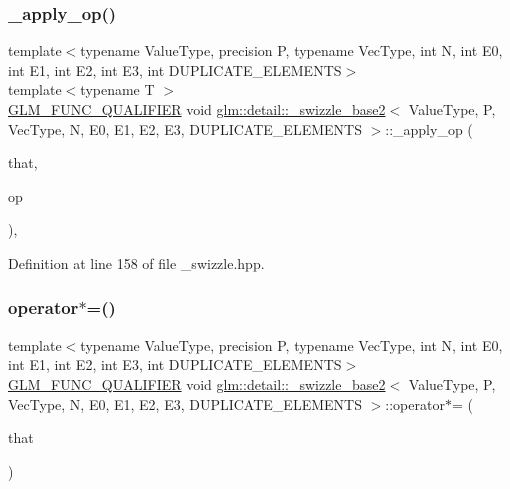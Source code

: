 \subsubsection{\texorpdfstring{\+\_\+apply\+\_\+op()}{\_apply\_op()}}
{\footnotesize\ttfamily template$<$typename Value\+Type, precision P, typename Vec\+Type, int N, int E0, int E1, int E2, int E3, int D\+U\+P\+L\+I\+C\+A\+T\+E\+\_\+\+E\+L\+E\+M\+E\+N\+TS$>$ \\
template$<$typename T $>$ \\
\hyperlink{setup_8hpp_a33fdea6f91c5f834105f7415e2a64407}{G\+L\+M\+\_\+\+F\+U\+N\+C\+\_\+\+Q\+U\+A\+L\+I\+F\+I\+ER} void \hyperlink{structglm_1_1detail_1_1__swizzle__base2}{glm\+::detail\+::\+\_\+swizzle\+\_\+base2}$<$ Value\+Type, P, Vec\+Type, N, E0, E1, E2, E3, D\+U\+P\+L\+I\+C\+A\+T\+E\+\_\+\+E\+L\+E\+M\+E\+N\+TS $>$\+::\+\_\+apply\+\_\+op (\begin{DoxyParamCaption}\item[{const Vec\+Type \&}]{that,  }\item[{T}]{op }\end{DoxyParamCaption})\hspace{0.3cm}{\ttfamily [inline]}, {\ttfamily [protected]}}



Definition at line 158 of file \+\_\+swizzle.\+hpp.

\mbox{\label{structglm_1_1detail_1_1__swizzle__base2_a6c686d110b936939c7ed67d7a6165778}} 
\subsubsection{\texorpdfstring{operator$\ast$=()}{operator*=()}}
{\footnotesize\ttfamily template$<$typename Value\+Type, precision P, typename Vec\+Type, int N, int E0, int E1, int E2, int E3, int D\+U\+P\+L\+I\+C\+A\+T\+E\+\_\+\+E\+L\+E\+M\+E\+N\+TS$>$ \\
\hyperlink{setup_8hpp_a33fdea6f91c5f834105f7415e2a64407}{G\+L\+M\+\_\+\+F\+U\+N\+C\+\_\+\+Q\+U\+A\+L\+I\+F\+I\+ER} void \hyperlink{structglm_1_1detail_1_1__swizzle__base2}{glm\+::detail\+::\+\_\+swizzle\+\_\+base2}$<$ Value\+Type, P, Vec\+Type, N, E0, E1, E2, E3, D\+U\+P\+L\+I\+C\+A\+T\+E\+\_\+\+E\+L\+E\+M\+E\+N\+TS $>$\+::operator$\ast$= (\begin{DoxyParamCaption}\item[{const Vec\+Type \&}]{that }\end{DoxyParamCaption})\hspace{0.3cm}{\ttfamily [inline]}}



